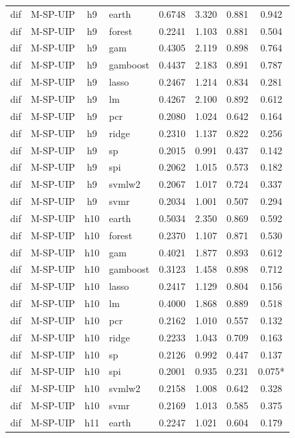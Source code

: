 \begin{ThreePartTable}
\begin{longtable}[t]{llclcccc}
dif & M-SP-UIP & h9 & earth & 0.6748 & 3.320 & 0.881 & 0.942\\
dif & M-SP-UIP & h9 & forest & 0.2241 & 1.103 & 0.881 & 0.504\\
dif & M-SP-UIP & h9 & gam & 0.4305 & 2.119 & 0.898 & 0.764\\
dif & M-SP-UIP & h9 & gamboost & 0.4437 & 2.183 & 0.891 & 0.787\\
dif & M-SP-UIP & h9 & lasso & 0.2467 & 1.214 & 0.834 & 0.281\\
dif & M-SP-UIP & h9 & lm & 0.4267 & 2.100 & 0.892 & 0.612\\
dif & M-SP-UIP & h9 & pcr & 0.2080 & 1.024 & 0.642 & 0.164\\
dif & M-SP-UIP & h9 & ridge & 0.2310 & 1.137 & 0.822 & 0.256\\
dif & M-SP-UIP & h9 & sp & 0.2015 & 0.991 & 0.437 & 0.142\\
dif & M-SP-UIP & h9 & spi & 0.2062 & 1.015 & 0.573 & 0.182\\
dif & M-SP-UIP & h9 & svmlw2 & 0.2067 & 1.017 & 0.724 & 0.337\\
dif & M-SP-UIP & h9 & svmr & 0.2034 & 1.001 & 0.507 & 0.294\\
\addlinespace
dif & M-SP-UIP & h10 & earth & 0.5034 & 2.350 & 0.869 & 0.592\\
dif & M-SP-UIP & h10 & forest & 0.2370 & 1.107 & 0.871 & 0.530\\
dif & M-SP-UIP & h10 & gam & 0.4021 & 1.877 & 0.893 & 0.612\\
dif & M-SP-UIP & h10 & gamboost & 0.3123 & 1.458 & 0.898 & 0.712\\
dif & M-SP-UIP & h10 & lasso & 0.2417 & 1.129 & 0.804 & 0.156\\
dif & M-SP-UIP & h10 & lm & 0.4000 & 1.868 & 0.889 & 0.518\\
dif & M-SP-UIP & h10 & pcr & 0.2162 & 1.010 & 0.557 & 0.132\\
dif & M-SP-UIP & h10 & ridge & 0.2233 & 1.043 & 0.709 & 0.163\\
dif & M-SP-UIP & h10 & sp & 0.2126 & 0.992 & 0.447 & 0.137\\
dif & M-SP-UIP & h10 & spi & 0.2001 & 0.935 & 0.231 & 0.075*\\
dif & M-SP-UIP & h10 & svmlw2 & 0.2158 & 1.008 & 0.642 & 0.328\\
dif & M-SP-UIP & h10 & svmr & 0.2169 & 1.013 & 0.585 & 0.375\\
\addlinespace
dif & M-SP-UIP & h11 & earth & 0.2247 & 1.021 & 0.604 & 0.179\\

\end{longtable}
\end{ThreePartTable}
